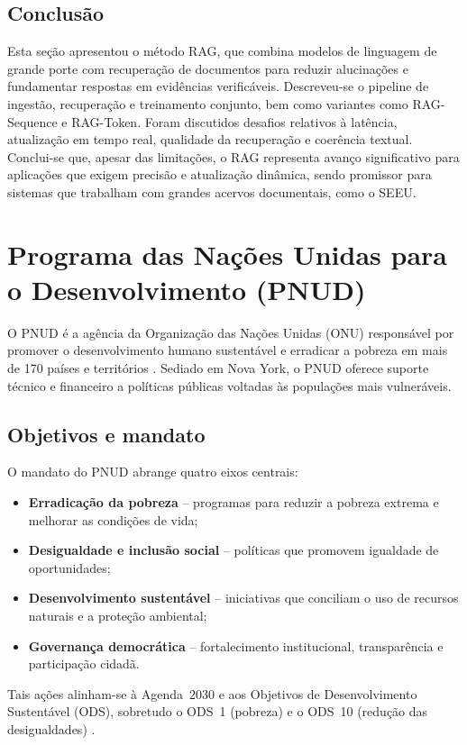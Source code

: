 \begin{description}
\subsection{Conclusão}
Esta seção apresentou o método RAG, que combina modelos de linguagem de grande porte com recuperação de documentos para reduzir alucinações e fundamentar respostas em evidências verificáveis. Descreveu-se o pipeline de ingestão, recuperação e treinamento conjunto, bem como variantes como RAG-Sequence e RAG-Token. Foram discutidos desafios relativos à latência, atualização em tempo real, qualidade da recuperação e coerência textual. Conclui-se que, apesar das limitações, o RAG representa avanço significativo para aplicações que exigem precisão e atualização dinâmica, sendo promissor para sistemas que trabalham com grandes acervos documentais, como o SEEU.

\section{Programa das Nações Unidas para o Desenvolvimento (PNUD)}
\label{sec:pnud}

O PNUD é a agência da Organização das Nações Unidas (ONU) responsável por promover o desenvolvimento
humano sustentável e erradicar a pobreza em mais de 170 países e territórios
\cite{undp2025sobre,undp2025onu}. Sediado em Nova York, o PNUD oferece suporte
técnico e financeiro a políticas públicas voltadas às populações mais
vulneráveis.

\subsection{Objetivos e mandato}
O mandato do PNUD abrange quatro eixos centrais:
\begin{itemize}
  \item \textbf{Erradicação da pobreza} – programas para reduzir a pobreza
  extrema e melhorar as condições de vida;
  \item \textbf{Desigualdade e inclusão social} – políticas que promovem
  igualdade de oportunidades;
  \item \textbf{Desenvolvimento sustentável} – iniciativas que conciliam o uso
  de recursos naturais e a proteção ambiental;
  \item \textbf{Governança democrática} – fortalecimento institucional,
  transparência e participação cidadã.
\end{itemize}
Tais ações alinham-se à Agenda~2030 e aos Objetivos de Desenvolvimento
Sustentável (ODS), sobretudo o ODS~1 (pobreza) e o ODS~10 (redução das
desigualdades) \cite{wikipedia2025pnud}.


\end{description}
